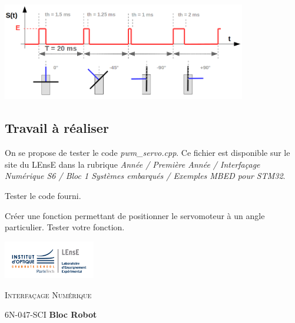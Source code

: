 \documentclass[a4paper,11pt,titlepage]{article} %
\begin{document}
\begin{center}
	\includegraphics[width=0.8\textwidth]{images/MINE_Nucleo_servomoteur.png}
\end{center}

\subsection{Travail à réaliser}

On se propose de tester le code \textsl{pwm\_servo.cpp}. Ce fichier est disponible sur le site du LEnsE dans la rubrique \textit{Année / Première Année / Interfaçage Numérique S6 / Bloc 1 Systèmes embarqués / Exemples MBED pour STM32}.

\Manip Tester le code fourni. 

\Manip Créer une fonction permettant de positionner le servomoteur à un angle particulier. Tester votre fonction. 



\newpage
\strut %
\begin{minipage}[c]{.25\linewidth}
	\includegraphics[width=4cm]{images/Logo-LEnsE.png}
\end{minipage} \hfill
\begin{minipage}[c]{.4\linewidth}

\begin{center}
\vspace{0.3cm}
{\Large \textsc{Interfaçage Numérique}}

\medskip

6N-047-SCI \qquad \textbf{\Large Bloc Robot}

\end{center}
\end{minipage}\hfill

\vspace{0.5cm}
\end{document}
